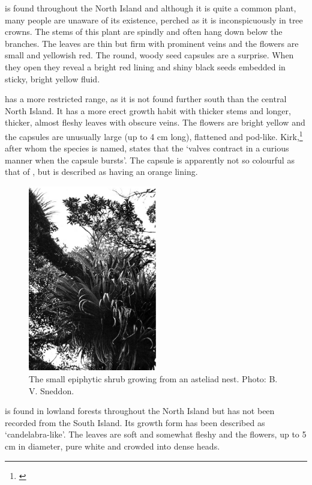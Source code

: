  is found throughout the North Island and although it is quite a common plant, many people are unaware of its existence, perched as it is inconspicuously in tree crowns.
The stems of this plant are spindly and often hang down below the branches.
The leaves are thin but firm with prominent veins and the flowers are small and yellowish red.
The round, woody seed capsules are a surprise.
When they open they reveal a bright red lining and shiny black seeds embedded in sticky, bright yellow fluid.

 has a more restricted range, as it is not found further south than the central North Island.
It has a more erect growth habit with thicker stems and longer, thicker, almost fleshy leaves with obscure veins.
The flowers are bright yellow and the capsules are unusually large (up to 4 cm long), flattened and pod-like.
Kirk,\footnote{\cite{kirk1869botany}} after whom the species is named, states that the `valves contract in a curious manner when the capsule bursts'.
The capsule is apparently not so colourful as that of , but is described as having an orange lining.

\begin{figure}
	\includegraphics[width=0.5\textwidth]{graphics/figure44brachyglottis-kirkii.jpg}
	\centering
	\caption[The small epiphytic shrub Brachyglottis kirkii]{The small epiphytic shrub  growing from an asteliad nest.
	Photo: B. V. Sneddon.}%
	\label{fig:44brachyglottis-kirkii}
\end{figure}

 is found in lowland forests throughout the North Island but has not been recorded from the South Island.
Its growth form has been described as `candelabra-like'.
The leaves are soft and somewhat fleshy and the flowers, up to 5 cm in diameter, pure white and crowded into dense heads.

